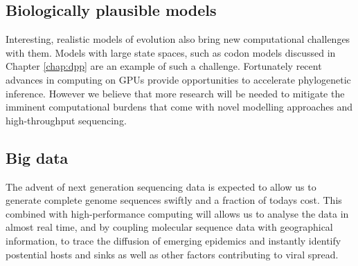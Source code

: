 \subsection{Biologically plausible models}

Interesting, realistic models of evolution also bring new computational challenges with them.
Models with large state spaces, such as codon models discussed in Chapter \ref{chap:dpp} are an example of such a challenge.
Fortunately recent advances in computing on GPUs \citep{Ayres2012} provide opportunities to accelerate phylogenetic inference.
However we believe that more research will be needed to mitigate the imminent computational burdens that come with novel modelling approaches and high-throughput sequencing. 

\subsection{Big data}

The advent of next generation sequencing data is expected to allow us to generate complete genome sequences swiftly and a fraction of todays cost.
This combined with high-performance computing will allows us to analyse the data in almost real time, and by coupling molecular sequence data with geographical information, to trace the diffusion of emerging epidemics and instantly identify postential hosts and sinks as well as other factors contributing to viral spread.   


